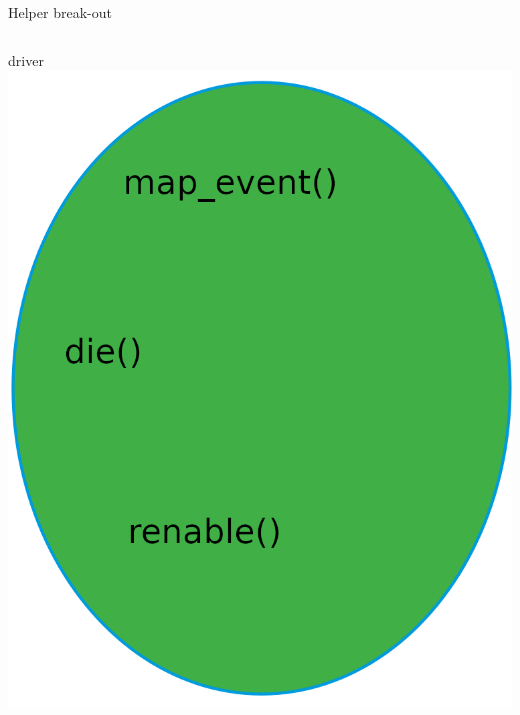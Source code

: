 \documentclass[aspectratio=169]{beamer}
\begin{document}
\begin{frame}[t]{Helper break-out}
\begin{columns}[onlytextwidth]
{	}
	driver \\[4pt]
	\includegraphics[width=1\linewidth]{img/isr/driver_size.png}
	\end{columns}
\end{frame}


\end{document}
